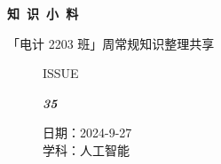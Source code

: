 \documentclass[UTF8]{ctexart}
\newcommand\Black[1]{\textcolor[gray]{0.3}{#1}}
\newcommand\Brown[1]{\textcolor[HTML]{998A4E}{#1}}
\newcommand\IssueNumber{35}
\newcommand\Date{2024-9-27}
\newcommand\Subject{人工智能}
\begin{document}
\BgThispage
\begin{center}
\phantom{...}

{\Large\textcolor{brown!40!white}{}}

\vspace{-2em}

{\Huge\bfseries\TitleFont \Black{知\ 识\ 小\ 料}}


\vspace{-0.1cm}
{\footnotesize \Brown{「电计 2203 班」周常规知识整理共享}}
\end{center}

\vspace{-0.5cm}


\begin{figure}[H]
\hspace{1cm}
\begin{minipage}[t]{0.3\textwidth}
\centering
    \Brown{\Genshin ISSUE}

    \vspace{-0.6cm}
    \Huge \Issue\slshape\bfseries\Black{\IssueNumber}
\end{minipage}
\hfill
\begin{minipage}[t]{0.35\textwidth}
\centering
    \Brown{日期：\Date} \\
\vspace{-0.1cm}
    \Brown{学科：\Subject} \\
\end{minipage}
\hspace{0.8cm}
\end{figure}
\end{document}

